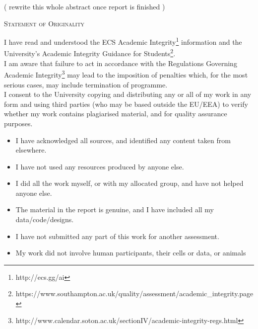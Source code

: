 \documentclass[12pt]{article}
\begin{document}
( rewrite this whole abstract once report is finished )



\newpage

\begin{center}
    \textsc{\LARGE Statement of Originality} \\ [1cm]
\end{center}
I have read and understood the ECS Academic Integrity\footnote{http://ecs.gg/ai} information and the University’s
Academic Integrity Guidance for Students\footnote{https://www.southampton.ac.uk/quality/assessment/academic\_integrity.page}.
\\[0.3cm]
I am aware that failure to act in accordance with the Regulations Governing Academic Integrity\footnote{http://www.calendar.soton.ac.uk/sectionIV/academic-integrity-regs.html}
may lead to the imposition of penalties which, for the most serious cases, may include
termination of programme.
\\[0.3cm]
I consent to the University copying and distributing any or all of my work in any form and
using third parties (who may be based outside the EU/EEA) to verify whether my work
contains plagiarised material, and for quality assurance purposes.
\\[0.5cm]

\begin{itemize}
    \item I have acknowledged all sources, and identified any content taken from elsewhere.
    \item I have not used any resources produced by anyone else.
    \item I did all the work myself, or with my allocated group, and have not helped anyone else.
    \item The material in the report is genuine, and I have included all my data/code/designs.
    \item I have not submitted any part of this work for another assessment.
    \item My work did not involve human participants, their cells or data, or animals
\end{itemize}

\end{document}
